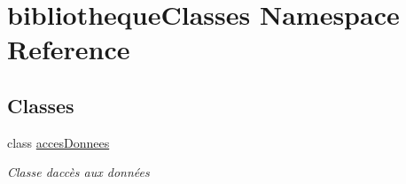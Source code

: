 \hypertarget{namespacebibliotheque_classes}{}\section{bibliotheque\+Classes Namespace Reference}
\label{namespacebibliotheque_classes}
\subsection*{Classes}
\begin{DoxyCompactItemize}
\item 
class \mbox{\hyperlink{classbibliotheque_classes_1_1acces_donnees}{acces\+Donnees}}
\begin{DoxyCompactList}\small\item\em Classe d\textquotesingle{}accès aux données \end{DoxyCompactList}\end{DoxyCompactItemize}

